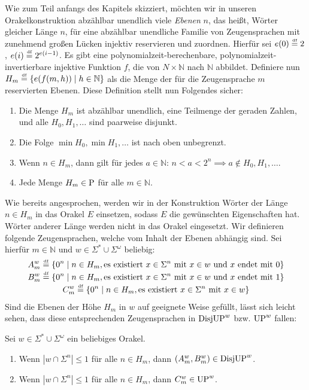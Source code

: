 Wie zum Teil anfangs des Kapitels skizziert, möchten wir in unseren Orakelkonstruktion abzählbar unendlich viele \emph{Ebenen} $n$, das heißt, Wörter gleicher Länge $n$, für eine abzählbar unendliche Familie von Zeugensprachen mit zunehmend großen Lücken injektiv reservieren und zuordnen.
Hierfür sei $e(0) \defeq 2$, $e(i) \defeq 2^{e(i-1)}$.
Es gibt eine polynomialzeit-berechenbare, polynomialzeit-invertierbare injektive Funktion $f$, die von $N\times\mathbb N$ nach $\mathbb N$ abbildet.
Definiere nun $H_m \defeq \{ e(f(m,h)) \mid h\in\mathbb N \}$ als die Menge der für die Zeugensprache $m$ reservierten Ebenen.
Diese Definition stellt nun Folgendes sicher:
\begin{observation}\label{obs:leveldefinitions}
    \begin{enumerate}
        \item Die Menge $H_m$ ist abzählbar unendlich, eine Teilmenge der geraden Zahlen, und alle $H_0, H_1, \dots$ sind paarweise disjunkt.
        \item Die Folge $\min H_0, \min H_1, \dots$ ist nach oben unbegrenzt.
        \item Wenn $n\in H_m$, dann gilt für jedes $a\in\mathbb N$: $n<a<2^{n} \implies a\not\in H_0, H_1, \dots$.
        \item Jede Menge $H_m\in \P$ für alle $m\in\mathbb N$.
    \end{enumerate}
\end{observation}


Wie bereits angesprochen, werden wir in der Konstruktion Wörter der Länge $n\in H_m$ in das Orakel $E$ einsetzen, sodass $E$ die gewünschten Eigenschaften hat.
Wörter anderer Länge werden nicht in das Orakel eingesetzt.
Wir definieren folgende Zeugensprachen, welche vom Inhalt der Ebenen abhängig sind. Sei hierfür $m\in\mathbb N$ und $w\in\Sigma^*\cup\Sigma^{\omega}$ beliebig:
\begin{gather*}
    A_m^w \defeq \{ 0^n \mid n\in H_m, \text{es existiert $x\in \Sigma^{n}$ mit } x\in w \text{ und $x$ endet mit $0$} \}\\
    B_m^w \defeq \{ 0^n \mid n\in H_m, \text{es existiert $x\in \Sigma^{n}$ mit } x\in w \text{ und $x$ endet mit $1$} \}\\
    C_m^w \defeq \{ 0^n \mid n\in H_m, \text{es existiert $x\in \Sigma^{n}$ mit } x\in w  \}
\end{gather*}
Sind die Ebenen der Höhe $H_m$ in $w$ auf geeignete Weise gefüllt, lässt sich leicht sehen, dass diese entsprechenden Zeugensprachen in $\DisjUP^w$ bzw. $\UP^w$ fallen:
\begin{claim}\label{claim:witnesslanguages}
    Sei $w\in\Sigma^*\cup\Sigma^\omega$ ein beliebiges Orakel.
    \begin{enumerate}
        \item Wenn $|w\cap \Sigma^{n}|\leq 1$ für alle $n\in H_m$, dann $(A_m^w, B_m^w)\in\DisjUP^w$.
        \item Wenn $|w\cap \Sigma^n|\leq 1$ für alle $n\in H_m$, dann $C_m^w \in \UP^w$.
    \end{enumerate}
\end{claim}

